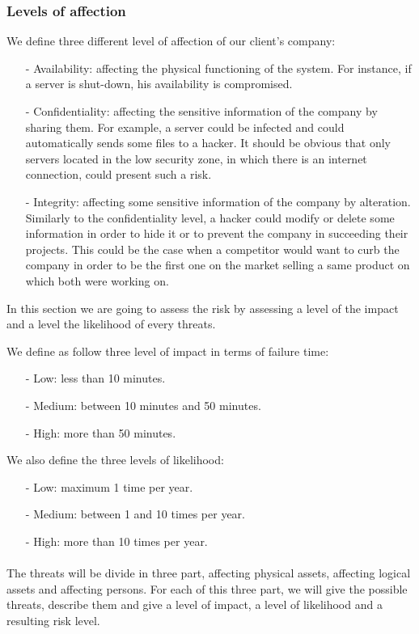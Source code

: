 \documentclass[a4paper,10pt]{article}
\begin{document}
\subsubsection{Levels of affection}
We define three different level of affection of our client's company:
\begin{enumerate}
\item[-] Availability: affecting the physical functioning of the system. For instance, if a server is shut-down, his availability is compromised.
\item[-] Confidentiality: affecting the sensitive information of the company by sharing them. For example, a server could be infected and could automatically sends some files to a hacker. It should be obvious that only servers located in the low security zone, in which there is an internet connection, could present such a risk.
\item[-] Integrity: affecting some sensitive information of the company by alteration. Similarly to the confidentiality level, a hacker could modify or delete some information in order to hide it or to prevent the company in succeeding their projects. This could be the case when a competitor would want to curb the company in order to be the first one on the market selling a same product on which both were working on.
\end{enumerate}

In this section we are going to assess the risk by  assessing a level of the impact and  a level the likelihood of every threats. 

We define as follow three level of impact in terms of failure time:
\begin{enumerate}
	\item[-] Low: less than 10 minutes.
	\item[-] Medium: between 10 minutes and 50 minutes.
	\item[-] High: more than 50 minutes.
\end{enumerate}

We also define the three levels of likelihood:
\begin{enumerate}
	\item[-] Low: maximum 1 time per year.
	\item[-] Medium: between 1 and 10 times per year.
	\item[-] High: more than 10 times per year.
\end{enumerate}

\paragraph{} The threats will be divide in three part, affecting physical assets, affecting logical assets and affecting persons. For each of this three part, we will give the possible threats, describe them and give a level of impact, a level of likelihood and a resulting risk level.
\end{document}

